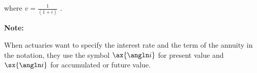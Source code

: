 \documentclass[12pt]{article}
\begin{document}

\begin{flushleft}
    where {\large $ v = \frac{1}{(1+i)} $ }.
\end{flushleft}
\vspace{.1in}

\begin{flushleft}
    \textbf{Note:} \\
\end{flushleft}

\begin{flushleft}
    When actuaries want to specify the interest rate and the term of the annuity in the notation, they use the symbol
    {\Large $ \ax{ \angln i} $} for present value and {\Large $ \sx{ \angln i} $} for accumulated or future value.
\end{flushleft}
\end{document}

